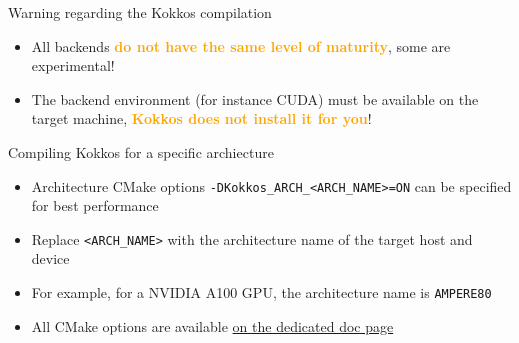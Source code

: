 \documentclass[aspectratio=169]{beamer}
\newcommand{\highlight}[1]{\textcolor{orange}{\textbf{#1}}}
\begin{document}

\begin{frame}{Warning regarding the Kokkos compilation}
    \begin{itemize}
        \item All backends \highlight{do not have the same level of maturity}, some are experimental!
        \item The backend environment (for instance CUDA) must be available on the target machine, \highlight{Kokkos does not install it for you}!
    \end{itemize}
\end{frame}


\begin{frame}{Compiling Kokkos for a specific archiecture}
    \begin{itemize}
        \item Architecture CMake options \texttt{-DKokkos\_ARCH\_<ARCH\_NAME>=ON} can be specified for best performance
        \item Replace \texttt{<ARCH\_NAME>} with the architecture name of the target host and device
        \item For example, for a NVIDIA A100 GPU, the architecture name is \texttt{AMPERE80}
        \item All CMake options are available \href{https://kokkos.org/kokkos-core-wiki/keywords.html}{on the dedicated doc page}
    \end{itemize}
\end{frame}

\end{document}
